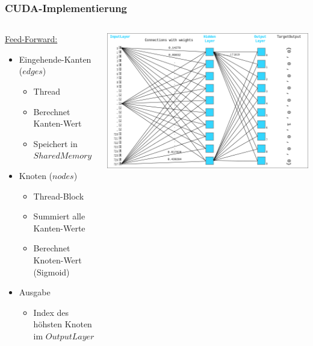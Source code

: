 \documentclass[xcolor=pdftex,dvipsnames,table]{beamer}
\begin{document}
	\begin{frame}
		\frametitle{CUDA-Implementierung}
		\begin{columns}
			\begin{column}{0.5\textwidth}
				\underline{Feed-Forward:}
				\begin{itemize}
					\item Eingehende-Kanten ($edges$)
					\begin{itemize}
						\item Thread
						\item Berechnet Kanten-Wert
						\item Speichert in $Shared Memory$
					\end{itemize}
					\item Knoten ($nodes$)
					\begin{itemize}
						\item Thread-Block
						\item Summiert alle Kanten-Werte
						\item Berechnet Knoten-Wert (Sigmoid)
					\end{itemize}
					\item Ausgabe
					\begin{itemize}
						\item Index des höhsten Knoten im $OutputLayer$
					\end{itemize}
				\end{itemize}
			\end{column}
			\begin{column}{0.6\textwidth}
				\includegraphics[width=1\textwidth]{nn.png}
			\end{column}
		\end{columns}
	\end{frame}
\end{document}
